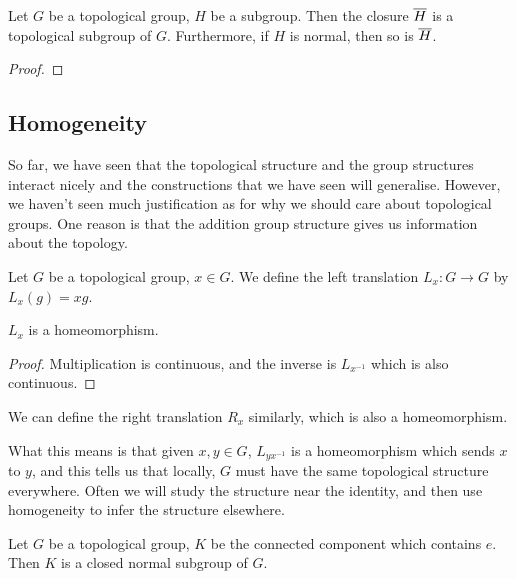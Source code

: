 \documentclass{article}
\begin{document}
    \begin{proposition}
        Let $G$ be a topological group, $H$ be a subgroup. Then the closure $\overline{H}$ is a topological subgroup of $G$. Furthermore, if $H$ is normal, then so is $\overline{H}$.
    \end{proposition}

    \begin{proof}
        
    \end{proof}

    \subsection{Homogeneity}

    So far, we have seen that the topological structure and the group structures interact nicely and the constructions that we have seen will generalise. However, we haven't seen much justification as for why we should care about topological groups. One reason is that the addition group structure gives us information about the topology.

    \begin{definition}

        Let $G$ be a topological group, $x \in G$. We define the left translation $L_x : G \to G$ by $L_x(g) = xg$.
    \end{definition}

    \begin{proposition}
        $L_x$ is a homeomorphism.
    \end{proposition}

    \begin{proof}
        Multiplication is continuous, and the inverse is $L_{x^{-1}}$ which is also continuous.
    \end{proof}

    \begin{remark}
        We can define the right translation $R_x$ similarly, which is also a homeomorphism.
    \end{remark}

    What this means is that given $x, y \in G$, $L_{yx^{-1}}$ is a homeomorphism which sends $x$ to $y$, and this tells us that locally, $G$ must have the same topological structure everywhere. Often we will study the structure near the identity, and then use homogeneity to infer the structure elsewhere.

    \begin{proposition}
        Let $G$ be a topological group, $K$ be the connected component which contains $e$. Then $K$ is a closed normal subgroup of $G$.
    \end{proposition}
\end{document}
